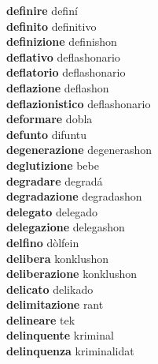 \textbf{definire } definí \\
\textbf{definito } definitivo \\
\textbf{definizione } definishon \\
\textbf{deflativo } deflashonario \\
\textbf{deflatorio } deflashonario \\
\textbf{deflazione } deflashon \\
\textbf{deflazionistico } deflashonario \\
\textbf{deformare } dobla \\
\textbf{defunto } difuntu \\
\textbf{degenerazione } degenerashon \\
\textbf{deglutizione } bebe \\
\textbf{degradare } degradá \\
\textbf{degradazione } degradashon \\
\textbf{delegato } delegado \\
\textbf{delegazione } delegashon \\
\textbf{delfino } dòlfein \\
\textbf{delibera } konklushon \\
\textbf{deliberazione } konklushon \\
\textbf{delicato } delikado \\
\textbf{delimitazione } rant \\
\textbf{delineare } tek \\
\textbf{delinquente } kriminal \\
\textbf{delinquenza } kriminalidat \\
